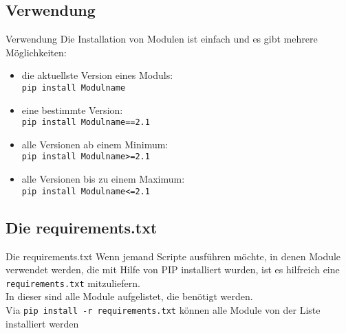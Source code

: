 \subsection{Verwendung}
\begin{frame}{Verwendung}
	Die Installation von Modulen ist einfach und es gibt mehrere M\"oglichkeiten:
	\begin{itemize}
		\item die aktuellste Version eines Moduls:\\
		\noindent\hspace*{.5cm} \texttt{pip install Modulname}
		\item eine bestimmte Version:\\
		\noindent\hspace*{.5cm} \texttt{pip install Modulname==2.1}
		\item alle Versionen ab einem Minimum:\\
		\noindent\hspace*{.5cm} \texttt{pip install Modulname>=2.1}
		\item alle Versionen bis zu einem Maximum:\\
		\noindent\hspace*{.5cm} \texttt{pip install Modulname<=2.1}
	\end{itemize}
\end{frame}



\subsection{Die requirements.txt}
\begin{frame}{Die requirements.txt}
	Wenn jemand Scripte ausf\"uhren m\"ochte, in denen Module verwendet werden, die mit Hilfe von PIP installiert wurden, ist es hilfreich eine \alert{\texttt{requirements.txt}} mitzuliefern.\\
	In dieser sind alle Module aufgelistet, die ben\"otigt werden.\\[.5cm]
	

	Via \alert{\texttt{pip install -r requirements.txt}} k\"onnen alle Module von der Liste installiert werden
\end{frame}


